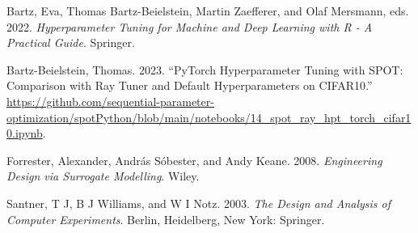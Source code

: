 \documentclass[
  letterpaper,
  DIV=11,
  numbers=noendperiod]{scrreprt}
\newlength{\cslhangindent}
\newenvironment{CSLReferences}[2] %
 {\begin{list}{}{%
  \setlength{\itemindent}{0pt}
  \setlength{\leftmargin}{0pt}
  \setlength{\parsep}{0pt}
  \ifodd #1
   \setlength{\leftmargin}{\cslhangindent}
   \setlength{\itemindent}{-1\cslhangindent}
  \fi
  \setlength{\itemsep}{#2\baselineskip}}}
 {\end{list}}
\begin{document}

\label{refs}
\begin{CSLReferences}{1}{0}
Bartz, Eva, Thomas Bartz-Beielstein, Martin Zaefferer, and Olaf
Mersmann, eds. 2022. \emph{{Hyperparameter Tuning for Machine and Deep
Learning with R - A Practical Guide}}. Springer.

Bartz-Beielstein, Thomas. 2023. {``{PyTorch} Hyperparameter Tuning with
{SPOT}: Comparison with {Ray Tuner} and Default Hyperparameters on
{CIFAR10}.''}
\url{https://github.com/sequential-parameter-optimization/spotPython/blob/main/notebooks/14_spot_ray_hpt_torch_cifar10.ipynb}.

Forrester, Alexander, András Sóbester, and Andy Keane. 2008.
\emph{{Engineering Design via Surrogate Modelling}}. Wiley.

Santner, T J, B J Williams, and W I Notz. 2003. \emph{{The Design and
Analysis of Computer Experiments}}. Berlin, Heidelberg, New York:
Springer.

\end{CSLReferences}
\end{document}
